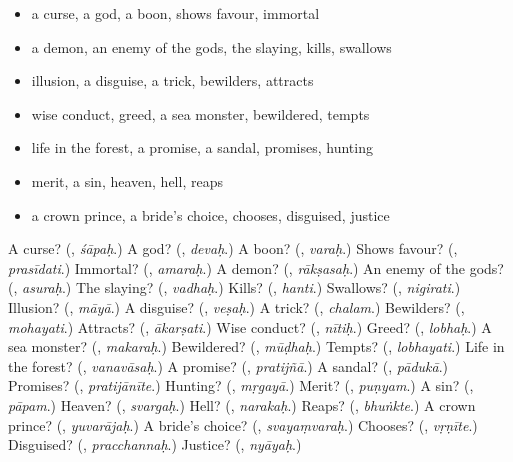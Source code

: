 \begin{itemize}
\raggedright
  \item a curse, a god, a boon, shows favour, immortal
  \item a demon, an enemy of the gods, the slaying, kills, swallows
  \item illusion, a disguise, a trick, bewilders, attracts
  \item wise conduct, greed, a sea monster, bewildered, tempts
  \item life in the forest, a promise, a sandal, promises, hunting
  \item merit, a sin, heaven, hell, reaps
  \item a crown prince, a bride's choice, chooses, disguised, justice
\end{itemize}

\begin{tcolorbox}[breakable,colback=teal!4,colframe=teal!35!black,title={Before you move on}]
A curse? (\textbf{}, \emph{śāpaḥ}.) A god? (\textbf{}, \emph{devaḥ}.) A boon? (\textbf{}, \emph{varaḥ}.) Shows favour? (\textbf{}, \emph{prasīdati}.) Immortal? (\textbf{}, \emph{amaraḥ}.) A demon? (\textbf{}, \emph{rākṣasaḥ}.) An enemy of the gods? (\textbf{}, \emph{asuraḥ}.) The slaying? (\textbf{}, \emph{vadhaḥ}.) Kills? (\textbf{}, \emph{hanti}.) Swallows? (\textbf{}, \emph{nigirati}.) Illusion? (\textbf{}, \emph{māyā}.) A disguise? (\textbf{}, \emph{veṣaḥ}.) A trick? (\textbf{}, \emph{chalam}.) Bewilders? (\textbf{}, \emph{mohayati}.) Attracts? (\textbf{}, \emph{ākarṣati}.) Wise conduct? (\textbf{}, \emph{nītiḥ}.) Greed? (\textbf{}, \emph{lobhaḥ}.) A sea monster? (\textbf{}, \emph{makaraḥ}.) Bewildered? (\textbf{}, \emph{mūḍhaḥ}.) Tempts? (\textbf{}, \emph{lobhayati}.) Life in the forest? (\textbf{}, \emph{vanavāsaḥ}.) A promise? (\textbf{}, \emph{pratijñā}.) A sandal? (\textbf{}, \emph{pādukā}.) Promises? (\textbf{}, \emph{pratijānīte}.) Hunting? (\textbf{}, \emph{mṛgayā}.) Merit? (\textbf{}, \emph{puṇyam}.) A sin? (\textbf{}, \emph{pāpam}.) Heaven? (\textbf{}, \emph{svargaḥ}.) Hell? (\textbf{}, \emph{narakaḥ}.) Reaps? (\textbf{}, \emph{bhuṅkte}.) A crown prince? (\textbf{}, \emph{yuvarājaḥ}.) A bride's choice? (\textbf{}, \emph{svayaṃvaraḥ}.) Chooses? (\textbf{}, \emph{vṛṇīte}.) Disguised? (\textbf{}, \emph{pracchannaḥ}.) Justice? (\textbf{}, \emph{nyāyaḥ}.)
\end{tcolorbox}
